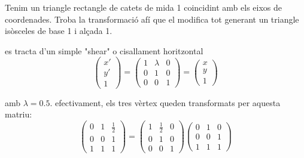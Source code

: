 \Exercise Tenim un triangle rectangle de catets de mida 1 coincidint amb els eixos de coordenades. Troba la transformació afí que el modifica tot generant un triangle isòsceles de base 1 i alçada 1. 

\Answer es tracta d’un simple "shear" o cisallament horitzontal
\[ \begin {pmatrix}x'\\y' \\1 \end {pmatrix}= \begin {pmatrix}1&\lambda &0\\0&1&0 \\0&0&1 \end {pmatrix}= \begin {pmatrix}x\\y \\1 \end {pmatrix} \]

amb \(\lambda =0.5\). efectivament, els tres vèrtex queden transformats per aquesta matriu:
\[ \begin {pmatrix}0&1&\frac {1}{2}\\0&0&1\\1&1&1 \end {pmatrix}= \begin {pmatrix}1&\frac {1}{2}&0\\0&1&0 \\0&0&1 \end {pmatrix} \begin {pmatrix}0&1&0\\0&0&1\\1&1&1 \end {pmatrix} \]

\blacksquare
